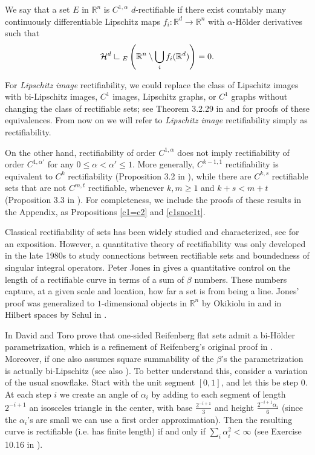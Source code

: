 \documentclass[11pt, twoside, leqno]{article}
\numberwithin{equation}{section}
\theoremstyle{plain}
\theoremstyle{definition}
\newcommand{\R}{\mathbb{R}}
\newcommand{\res}{\hbox{ {\vrule height .22cm}{\leaders\hrule\hskip.2cm} }} %
\begin{document}
We say that a set $E$ in $\R^n$ is $C^{1,\alpha}$ $d$-rectifiable if there exist countably many continuously differentiable Lipschitz maps $f_i \colon \R^d \to \R^n$ with $\alpha$-H\"{o}lder derivatives such that
\begin{equation}
\mathcal{H}^d\res_E \left( \R^n \setminus \bigcup_i f_i(\R^d)\right)=0.
\end{equation}

For \emph{Lipschitz image} rectifiability, we could replace the class of Lipschitz images with bi-Lipschitz images, $C^1$ images, Lipschitz graphs, or $C^1$ graphs without changing the class of rectifiable sets; see Theorem 3.2.29 in   \cite{federer} and   \cite{davidbook} for proofs of these equivalences. From now on we will refer to \emph{Lipschitz image} rectifiability simply as rectifiability.

On the other hand, rectifiability of order $C^{1,\alpha}$ does not imply rectifiability of order $C^{1,\alpha'}$ for any $0 \leq \alpha < \alpha' \leq 1$. More generally, $C^{k-1,1}$ rectifiability is equivalent to $C^k$ rectifiability (Proposition 3.2 in \cite{anzellottiserapioni}), while there are $C^{k,s}$ rectifiable sets that are not $C^{m,t}$ rectifiable, whenever $k,m \geq 1$ and $k + s <m+t$ (Proposition 3.3 in \cite{anzellottiserapioni}). For completeness, we include the proofs of these results in the Appendix, as Propositions \ref{c1=c2} and \ref{c1snoc1t}.


Classical rectifiability of sets has been widely studied and characterized, see \cite{mattila} for an exposition. However, a quantitative theory of rectifiability was only developed in the late 1980s to study connections between rectifiable sets and boundedness of singular integral operators.
Peter Jones in \cite{atst} gives a quantitative control on the length of a rectifiable curve in terms of a sum of $\beta$ numbers. These numbers capture, at a given scale and location, how far a set is from being a line. Jones' proof was generalized to $1$-dimensional objects in $\R^n$ by Okikiolu in   \cite{okikiolu} and in Hilbert spaces by Schul in \cite {raananhilbert}. 


In  \cite{davidtoro} David and Toro prove that one-sided Reifenberg flat sets admit a bi-H\"{o}lder parametrization, which is a refinement of Reifenberg's original proof in \cite{reifen}. Moreover, if one also assumes square summability of the $\beta$'s the parametrization is actually bi-Lipschitz (see also \cite{toro1995}). To better understand this, consider a variation of the usual snowflake. Start with the unit segment $[0,1]$, and let this be step $0$. At each step $i$ we create an angle of $\alpha_i$ by adding to each segment of length $2^{-i+1}$ an isosceles triangle in the center, with base $\frac{2^{-i+1}}{3}$ and height $\frac{2^{-i+1}\alpha_i}{6}$ (since the $\alpha_i$'s are small we can use a first order approximation). Then the resulting curve is rectifiable (i.e. has finite length) if and only if $\sum_i\alpha_i^2 < \infty$ (see Exercise 10.16 in   \cite{bishopperes}).
\end{document}
